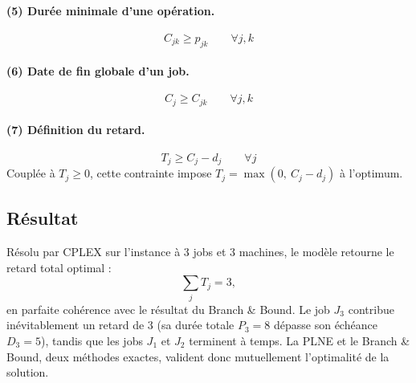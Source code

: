 \paragraph{(5) Durée minimale d'une opération.}
\begin{equation}
    C_{jk} \geq p_{jk} \qquad \forall j, k
\end{equation}

\paragraph{(6) Date de fin globale d'un job.}
\begin{equation}
    C_{j} \geq C_{jk} \qquad \forall j, k
\end{equation}

\paragraph{(7) Définition du retard.}
\begin{equation}
    T_{j} \geq C_{j} - d_{j} \qquad \forall j
\end{equation}
Couplée à $T_j \geq 0$, cette contrainte impose $T_j = \max(0,\ C_j - d_j)$ à l'optimum.

\subsection{Résultat}

Résolu par CPLEX sur l'instance à 3 jobs et 3 machines, le modèle retourne le retard total optimal :
\begin{equation}
    \sum_j T_j = 3,
\end{equation}
en parfaite cohérence avec le résultat du Branch \& Bound. Le job $J_3$ contribue inévitablement un retard de 3 (sa durée totale $P_3 = 8$ dépasse son échéance $D_3 = 5$), tandis que les jobs $J_1$ et $J_2$ terminent à temps. La PLNE et le Branch \& Bound, deux méthodes exactes, valident donc mutuellement l'optimalité de la solution.
